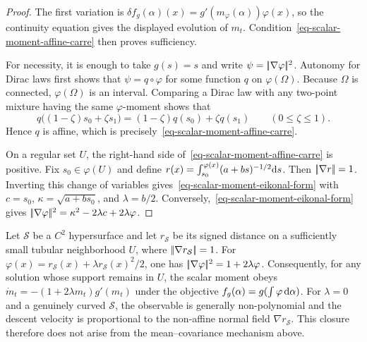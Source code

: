 \begin{proof}
	The first variation is $\delta f_g(\alpha)(x)=g'(m_\varphi(\alpha))\varphi(x)$, so the continuity equation gives the displayed evolution of $m_t$. Condition~\eqref{eq-scalar-moment-affine-carre} then proves sufficiency.

	For necessity, it is enough to take $g(s)=s$ and write $\psi=|\!| \nabla\varphi |\!|^2$. Autonomy for Dirac laws first shows that $\psi=q\circ\varphi$ for some function $q$ on $\varphi(\Omega)$. Because $\Omega$ is connected, $\varphi(\Omega)$ is an interval. Comparing a Dirac law with any two-point mixture having the same $\varphi$-moment shows that
	\[
		q\bigl((1-\zeta)s_0+\zeta s_1\bigr)
		=
		(1-\zeta)q(s_0)+\zeta q(s_1)
		\qquad (0\leq\zeta\leq1).
	\]
	Hence $q$ is affine, which is precisely~\eqref{eq-scalar-moment-affine-carre}.

	On a regular set $U$, the right-hand side of~\eqref{eq-scalar-moment-affine-carre} is positive. Fix $s_0\in\varphi(U)$ and define $r(x)=\int_{s_0}^{\varphi(x)}(a+bs)^{-1/2}\mathrm{d} s$.
	Then $|\!| \nabla r |\!|=1$. Inverting this change of variables gives~\eqref{eq-scalar-moment-eikonal-form} with $c=s_0$, $\kappa=\sqrt{a+bs_0}$, and $\lambda=b/2$. Conversely,~\eqref{eq-scalar-moment-eikonal-form} gives
	$|\!| \nabla\varphi |\!|^2=\kappa^2-2\lambda c+2\lambda\varphi$.
\end{proof}

\begin{example}
	Let $\mathcal S$ be a $C^2$ hypersurface and let $r_{\mathcal S}$ be its signed distance on a sufficiently small tubular neighborhood $U$, where $|\!| \nabla r_{\mathcal S} |\!|=1$. For
	$\varphi(x)=r_{\mathcal S}(x)+\lambda r_{\mathcal S}(x)^2/2$, one has $|\!| \nabla\varphi |\!|^2=1+2\lambda\varphi$. Consequently, for any solution whose support remains in $U$, the scalar moment obeys $\dot m_t=-(1+2\lambda m_t)g'(m_t)$ under the objective $f_g(\alpha)=g(\int\varphi\,\mathrm{d}\alpha)$.
	For $\lambda=0$ and a genuinely curved $\mathcal S$, the observable is generally non-polynomial and the descent velocity is proportional to the non-affine normal field $\nabla r_{\mathcal S}$. This closure therefore does not arise from the mean--covariance mechanism above.
\end{example}
